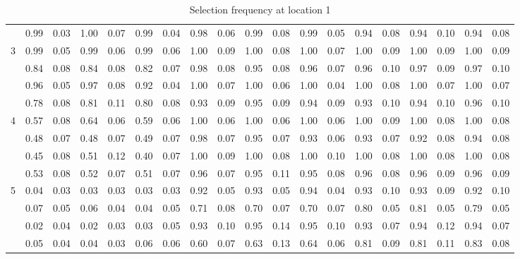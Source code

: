 \documentclass[authoryear, review, 11pt]{elsarticle}
\begin{document}
\begin{table}
\begin{center}
{\begin{tabular}{ccc|cc|cc|cc|cc|cc|cc|cc|cc}
		  & 0.99 & 0.03 & 1.00 & 0.07 & 0.99 & 0.04 & 0.98 & 0.06 & 0.99 & 0.08 & 0.99 & 0.05 & 0.94 & 0.08 & 0.94 & 0.10 & 0.94 & 0.08 \\ 
		  \cline{2-19}
		  \multirow{4}{*}{3} & 0.99 & 0.05 & 0.99 & 0.06 & 0.99 & 0.06 & 1.00 & 0.09 & 1.00 & 0.08 & 1.00 & 0.07 & 1.00 & 0.09 & 1.00 & 0.09 & 1.00 & 0.09 \\ 
		  & 0.84 & 0.08 & 0.84 & 0.08 & 0.82 & 0.07 & 0.98 & 0.08 & 0.95 & 0.08 & 0.96 & 0.07 & 0.96 & 0.10 & 0.97 & 0.09 & 0.97 & 0.10 \\ 
		  & 0.96 & 0.05 & 0.97 & 0.08 & 0.92 & 0.04 & 1.00 & 0.07 & 1.00 & 0.06 & 1.00 & 0.04 & 1.00 & 0.08 & 1.00 & 0.07 & 1.00 & 0.07 \\ 
		  & 0.78 & 0.08 & 0.81 & 0.11 & 0.80 & 0.08 & 0.93 & 0.09 & 0.95 & 0.09 & 0.94 & 0.09 & 0.93 & 0.10 & 0.94 & 0.10 & 0.96 & 0.10 \\ 
		  \cline{2-19}
		  \multirow{4}{*}{4} & 0.57 & 0.08 & 0.64 & 0.06 & 0.59 & 0.06 & 1.00 & 0.06 & 1.00 & 0.06 & 1.00 & 0.06 & 1.00 & 0.09 & 1.00 & 0.08 & 1.00 & 0.08 \\ 
		  & 0.48 & 0.07 & 0.48 & 0.07 & 0.49 & 0.07 & 0.98 & 0.07 & 0.95 & 0.07 & 0.93 & 0.06 & 0.93 & 0.07 & 0.92 & 0.08 & 0.94 & 0.08 \\ 
		  & 0.45 & 0.08 & 0.51 & 0.12 & 0.40 & 0.07 & 1.00 & 0.09 & 1.00 & 0.08 & 1.00 & 0.10 & 1.00 & 0.08 & 1.00 & 0.08 & 1.00 & 0.08 \\ 
		  & 0.53 & 0.08 & 0.52 & 0.07 & 0.51 & 0.07 & 0.96 & 0.07 & 0.95 & 0.11 & 0.95 & 0.08 & 0.96 & 0.08 & 0.96 & 0.09 & 0.96 & 0.09 \\
		  \cline{2-19}
		  \multirow{4}{*}{5} & 0.04 & 0.03 & 0.03 & 0.03 & 0.03 & 0.03 & 0.92 & 0.05 & 0.93 & 0.05 & 0.94 & 0.04 & 0.93 & 0.10 & 0.93 & 0.09 & 0.92 & 0.10 \\ 
		  & 0.07 & 0.05 & 0.06 & 0.04 & 0.04 & 0.05 & 0.71 & 0.08 & 0.70 & 0.07 & 0.70 & 0.07 & 0.80 & 0.05 & 0.81 & 0.05 & 0.79 & 0.05 \\ 
		  & 0.02 & 0.04 & 0.02 & 0.03 & 0.03 & 0.05 & 0.93 & 0.10 & 0.95 & 0.14 & 0.95 & 0.10 & 0.93 & 0.07 & 0.94 & 0.12 & 0.94 & 0.07 \\ 
		  & 0.05 & 0.04 & 0.04 & 0.03 & 0.06 & 0.06 & 0.60 & 0.07 & 0.63 & 0.13 & 0.64 & 0.06 & 0.81 & 0.09 & 0.81 & 0.11 & 0.83 & 0.08 \\ 
		  \end{tabular}}
		\caption{Selection frequency at location 1\label{table:selection}}
		\end{center}
		\end{table}
		
\end{document}
